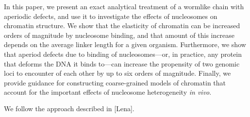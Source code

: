 \documentclass[%
 reprint,
superscriptaddress,
showpacs,preprintnumbers,
 amsmath,amssymb,
 aps,
 prl,
]{revtex4-1}
\begin{document}
In this paper, we present an exact analytical treatment of a wormlike chain
    with aperiodic defects, and use it to investigate the effects of nucleosomes
    on chromatin structure.
We show that the elasticity of chromatin can be increased orders of magnitude by
    nucleosome binding, and that amount of this increase depends on the average
    linker length for a given organism.
Furthermore, we show that aperiod defects due to binding of nucleosomes---or, in
    practice, any protein that deforms the DNA it binds to---can increase the
    propensity of two genomic loci to encounter of each other by up to six
    orders of magnitude.
Finally, we provide guidance for constructing coarse-grained models of chromatin
    that account for the important effects of nucleosome heterogeneity
    \textit{in vivo}.



We follow the approach described in [Lena].







\end{document}
